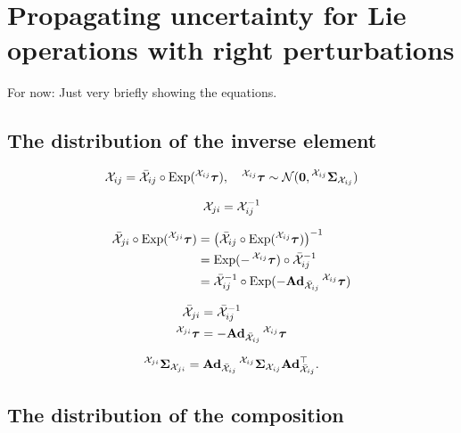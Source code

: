 \chapter{Propagating uncertainty for Lie operations with right perturbations} \label{ch:app-prop-lie-operations}
For now: Just very briefly showing the equations.

\section{The distribution of the inverse element}
\begin{equation}
    \cX_{ij} = \bar{\cX}_{ij} \circ \Exp(\prescript{\cX_{ij}}{}{\vectau}), \quad \prescript{\cX_{ij}}{}{\vectau} \sim \cN(\matr{0}, \prescript{\cX_{ij}}{}{\matSigma_{\cX_{ij}}})
\end{equation}

\begin{equation}
    \cX_{ji} = \cX^{-1}_{ij}
\end{equation}

\begin{subequations}
\begin{align}
    \bar{\cX}_{ji} \circ \Exp(\prescript{\cX_{ji}}{}{\vectau}) &= \left( \bar{\cX}_{ij} \circ \Exp(\prescript{\cX_{ij}}{}{\vectau}) \right)^{-1}\\
    &= \Exp(-\prescript{\cX_{ij}}{}{\vectau}) \circ \bar{\cX}_{ij}^{-1}\\
    &= \bar{\cX}_{ij}^{-1} \circ \Exp(- \mAd_{\bar{\cX}_{ij}} \prescript{\cX_{ij}}{}{\vectau})
\end{align}
\end{subequations}

\begin{align}
    \bar{\cX}_{ji} &= \bar{\cX}_{ij}^{-1}\\
    \prescript{\cX_{ji}}{}{\vectau} &= - \mAd_{\bar{\cX}_{ij}} \prescript{\cX_{ij}}{}{\vectau}
\end{align}

\begin{equation}
  \prescript{\cX_{ji}}{}{\matSigma}_{\cX_{ji}} = \mAd_{\bar{\cX}_{ij}} \prescript{\cX_{ij}}{}{\matSigma_{\cX_{ij}}} \mAd_{\bar{\cX}_{ij}}\trans.
\end{equation}

\section{The distribution of the composition}

